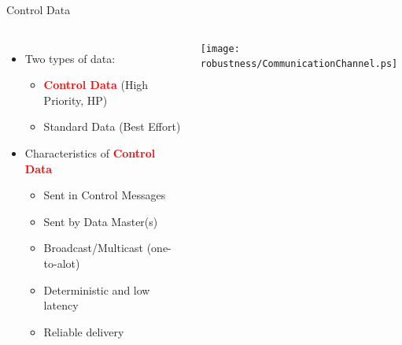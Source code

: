 \documentclass[compress,red]{beamer}
\begin{document}
\begin{frame}{Control Data}

\begin{columns}[c]
    \begin{itemize}
      \item Two types of data:
	  \begin{itemize}
	    \item \textcolor{red}{\bf Control Data} (High Priority, HP)
	    \item Standard Data (Best Effort)
	  \end{itemize}
	  \item Characteristics of \textcolor{red}{\bf Control Data}
	  \begin{itemize}
	    \item Sent in Control Messages
	    \item Sent by Data Master(s)
	    \item Broadcast/Multicast (one-to-alot)
	    \item Deterministic and low latency
	    \item Reliable delivery
	  \end{itemize}
    \end{itemize}
    \begin{center}
    \texttt{[image: robustness/CommunicationChannel.ps]}
    \end{center}

\end{columns}

\end{frame}
\end{document}
